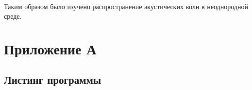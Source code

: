\documentclass[a4paper, fontsize=14pt]{article}
\begin{document}
Таким образом было изучено распространение акустических волн в неоднородной среде.



\newpage


\printbibliography

\newpage
\section*{Приложение А}
\subsection*{Листинг программы}










\end{document}
